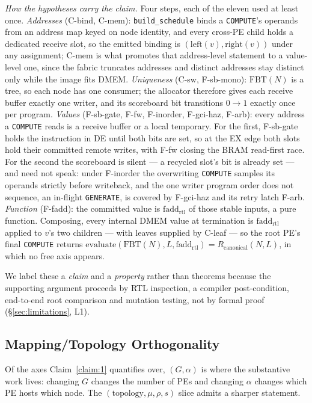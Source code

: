 \documentclass[journal,10pt]{IEEEtran}
\theoremstyle{plain}
\theoremstyle{definition}
\theoremstyle{remark}
\newcommand{\FBT}{\ensuremath{\mathrm{FBT}}}
\newcommand{\fadd}{\ensuremath{\mathrm{fadd}_{\mathrm{rtl}}}}
\newcommand{\Rcan}{\ensuremath{R_{\mathrm{canonical}}}}
\newcommand{\sv}[1]{\texttt{#1}}
\newcommand{\asgn}{\ensuremath{\alpha}}
\newcommand{\map}{\ensuremath{\mu}}
\begin{document}
\emph{How the hypotheses carry the claim.} Four steps, each of the eleven
used at least once. \emph{Addresses} (\textsf{C-bind}, \textsf{C-mem}):
\sv{build\_schedule} binds a \texttt{COMPUTE}'s operands from an address map
keyed on node identity, and every cross-PE child holds a dedicated receive
slot, so the emitted binding is $(\mathrm{left}(v),\mathrm{right}(v))$ under
any assignment; \textsf{C-mem} is what promotes that address-level statement
to a value-level one, since the fabric truncates addresses and distinct
addresses stay distinct only while the image fits DMEM. \emph{Uniqueness}
(\textsf{C-sw}, \textsf{F-sb-mono}): $\FBT(N)$ is a tree, so each node has one
consumer; the allocator therefore gives each receive buffer exactly one
writer, and its scoreboard bit transitions $0\to1$ exactly once per program.
\emph{Values} (\textsf{F-sb-gate}, \textsf{F-fw}, \textsf{F-inorder},
\textsf{F-gci-haz}, \textsf{F-arb}): every address a \texttt{COMPUTE} reads is
a receive buffer or a local temporary. For the first, \textsf{F-sb-gate} holds
the instruction in \textsf{DE} until both bits are set, so at the EX edge both
slots hold their committed remote writes, with \textsf{F-fw} closing the
BRAM read-first race. For the second the scoreboard is silent --- a recycled
slot's bit is already set --- and need not speak: under \textsf{F-inorder} the
overwriting \texttt{COMPUTE} samples its operands strictly before writeback,
and the one writer program order does not sequence, an in-flight
\texttt{GENERATE}, is covered by \textsf{F-gci-haz} and its retry latch
\textsf{F-arb}. \emph{Function} (\textsf{F-fadd}): the committed value is
$\fadd$ of those stable inputs, a pure function. Composing, every internal
DMEM value at termination is $\fadd$ applied to $v$'s two children --- with
leaves supplied by \textsf{C-leaf} --- so the root PE's final \texttt{COMPUTE}
returns $\mathrm{evaluate}(\FBT(N), L, \fadd) = \Rcan(N,L)$, in which no free
axis appears.

We label these a \emph{claim} and a \emph{property} rather than theorems
because the supporting argument proceeds by RTL inspection, a compiler
post-condition, end-to-end root comparison and mutation testing, not by formal
proof (\S\ref{sec:limitations}, L1).

\subsection{Mapping/Topology Orthogonality}\label{sec:abi-orth}

Of the axes Claim~\ref{claim:1} quantifies over, $(G,\asgn)$ is where the
substantive work lives: changing $G$ changes the number of PEs and changing
$\asgn$ changes which PE hosts which node. The $(\text{topology},\map,\rho,s)$
slice admits a sharper statement.
\end{document}

